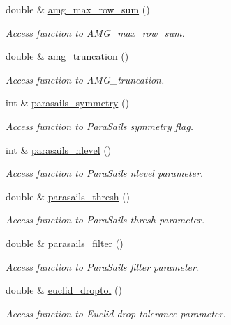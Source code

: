 \begin{DoxyCompactItemize}
double \& \hyperlink{classoomph_1_1HypreSolver_a3a7c59ae6c9fb35a2aa4708bee84a3f9}{amg\+\_\+max\+\_\+row\+\_\+sum} ()
\begin{DoxyCompactList}\small\item\em Access function to A\+M\+G\+\_\+max\+\_\+row\+\_\+sum. \end{DoxyCompactList}\item 
double \& \hyperlink{classoomph_1_1HypreSolver_ad591a3eb6ba46fef20f027887aeac30b}{amg\+\_\+truncation} ()
\begin{DoxyCompactList}\small\item\em Access function to A\+M\+G\+\_\+truncation. \end{DoxyCompactList}\item 
int \& \hyperlink{classoomph_1_1HypreSolver_aa58cd92f9b766dd9a7c77c536530628a}{parasails\+\_\+symmetry} ()
\begin{DoxyCompactList}\small\item\em Access function to Para\+Sails symmetry flag. \end{DoxyCompactList}\item 
int \& \hyperlink{classoomph_1_1HypreSolver_ae782f254e96931adc3277ef010bd9896}{parasails\+\_\+nlevel} ()
\begin{DoxyCompactList}\small\item\em Access function to Para\+Sails nlevel parameter. \end{DoxyCompactList}\item 
double \& \hyperlink{classoomph_1_1HypreSolver_a64bfb100909ce50177f3433b2df83c65}{parasails\+\_\+thresh} ()
\begin{DoxyCompactList}\small\item\em Access function to Para\+Sails thresh parameter. \end{DoxyCompactList}\item 
double \& \hyperlink{classoomph_1_1HypreSolver_a6bb6fcd2817efa639fcfd68c6c62578f}{parasails\+\_\+filter} ()
\begin{DoxyCompactList}\small\item\em Access function to Para\+Sails filter parameter. \end{DoxyCompactList}\item 
double \& \hyperlink{classoomph_1_1HypreSolver_a2139396d71f35809314c1eec467a5749}{euclid\+\_\+droptol} ()
\begin{DoxyCompactList}\small\item\em Access function to Euclid drop tolerance parameter. \end{DoxyCompactList}\item 

\end{DoxyCompactItemize}
